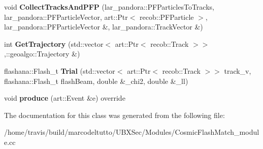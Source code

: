 \begin{DoxyCompactItemize}
\item 
\hypertarget{classCosmicFlashMatch_a29112dc33d6ce0be700ad02f967d709d}{void {\bfseries Collect\-Tracks\-And\-P\-F\-P} (lar\-\_\-pandora\-::\-P\-F\-Particles\-To\-Tracks, lar\-\_\-pandora\-::\-P\-F\-Particle\-Vector, art\-::\-Ptr$<$ recob\-::\-P\-F\-Particle $>$, lar\-\_\-pandora\-::\-P\-F\-Particle\-Vector \&, lar\-\_\-pandora\-::\-Track\-Vector \&)}\label{classCosmicFlashMatch_a29112dc33d6ce0be700ad02f967d709d}

\item 
\hypertarget{classCosmicFlashMatch_a3208db108dea02a5c7113205137ea363}{int {\bfseries Get\-Trajectory} (std\-::vector$<$ art\-::\-Ptr$<$ recob\-::\-Track $>$$>$,\-::geoalgo\-::\-Trajectory \&)}\label{classCosmicFlashMatch_a3208db108dea02a5c7113205137ea363}

\item 
\hypertarget{classCosmicFlashMatch_ac329a3c7f942e9c7d26ecee88f91c8ea}{flashana\-::\-Flash\-\_\-t {\bfseries Trial} (std\-::vector$<$ art\-::\-Ptr$<$ recob\-::\-Track $>$$>$ track\-\_\-v, flashana\-::\-Flash\-\_\-t flash\-Beam, double \&\-\_\-chi2, double \&\-\_\-ll)}\label{classCosmicFlashMatch_ac329a3c7f942e9c7d26ecee88f91c8ea}

\item 
\hypertarget{classCosmicFlashMatch_aebcbe54d9d6fc9e14b98a008d7776308}{void {\bfseries produce} (art\-::\-Event \&e) override}\label{classCosmicFlashMatch_aebcbe54d9d6fc9e14b98a008d7776308}

\end{DoxyCompactItemize}


The documentation for this class was generated from the following file\-:\begin{DoxyCompactItemize}
\item 
/home/travis/build/marcodeltutto/\-U\-B\-X\-Sec/\-Modules/Cosmic\-Flash\-Match\-\_\-module.\-cc\end{DoxyCompactItemize}

